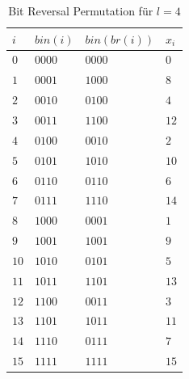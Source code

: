 \documentclass[a4paper,12pt]{article}
\begin{document}
\begin{table}
	\begin{center}
		\begin{tabular}[c]{|l|l|l|l|}
			\hline
			$i$ & $\mathit{bin}\left(i\right)$ &$\mathit{bin}\left(\mathit{br}\left(i\right)\right)$  &$x_i$\\
			\hline
			$0$ & $0000$ &$0000$  &$0$\\
			\hline
			$1$ & $0001$ &$1000$  &$8$\\
			\hline
			$2$ & $0010$ &$0100$  &$4$\\
			\hline
			$3$ & $0011$ &$1100$  &$12$\\
			\hline
			$4$ & $0100$ &$0010$  &$2$\\
			\hline
			$5$ & $0101$ &$1010$  &$10$\\
			\hline
			$6$ & $0110$ &$0110$  &$6$\\
			\hline
			$7$ & $0111$ &$1110$  &$14$\\
			\hline
			$8$ & $1000$ &$0001$  &$1$\\
			\hline
			$9$ & $1001$ &$1001$  &$9$\\
			\hline
			$10$& $1010$ &$0101$  &$5$\\
			\hline
			$11$& $1011$ &$1101$  &$13$\\
			\hline
			$12$ &$1100$ &$0011$  &$3$\\
			\hline
			$13$ &$1101$ &$1011$  &$11$\\
			\hline
			$14$ &$1110$ &$0111$  &$7$\\
			\hline
			$15$ &$1111$ &$1111$  &$15$\\
			\hline
		\end{tabular}
		\caption{Bit Reversal Permutation für $l=4$} 
		\label{tab:bitReversal}
	\end{center}
\end{table}
\end{document}
